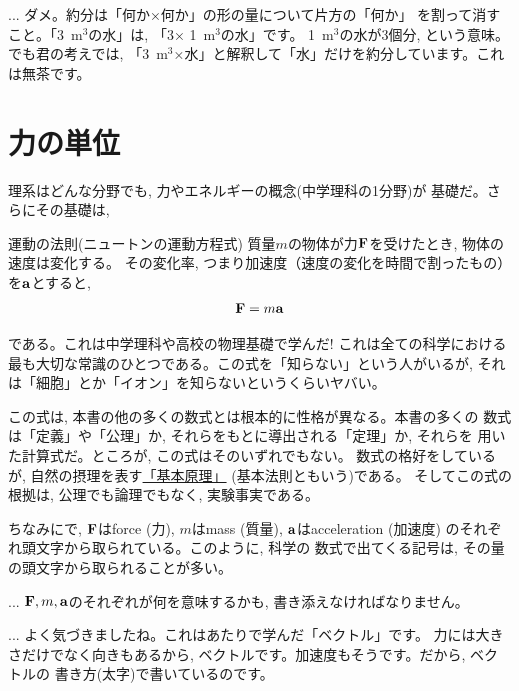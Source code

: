 \begin{faq}{\small{}
 ... ダメ。約分は「何か×何か」の形の量について片方の「何か」
を割って消すこと。「3~m$^3$の水」は, 「3× 1~m$^3$の水」です。
1~m$^3$の水が3個分, という意味。でも君の考えでは, 
「3~m$^3$×水」と解釈して「水」だけを約分しています。これは無茶です。}
\end{faq}
\mv


\section{力の単位}

理系はどんな分野でも, 力やエネルギーの概念(中学理科の1分野)が
基礎だ。さらにその基礎は, 
\begin{itembox}{運動の法則(ニュートンの運動方程式)}
質量$m$の物体が力${\bf F}$を受けたとき, 物体の速度は変化する。
その変化率, つまり加速度（速度の変化を時間で割ったもの）を${\bf a}$とすると,
\begin{eqnarray}{\bf F}=m{\bf a}\label{eq:Newton_eqmotion}\end{eqnarray}
\end{itembox}
である。これは中学理科や高校の物理基礎で学んだ! これは全ての科学における
最も大切な常識のひとつである。この式を「知らない」という人がいるが, 
それは「細胞」とか「イオン」を知らないというくらいヤバい。

この式は, 本書の他の多くの数式とは根本的に性格が異なる。本書の多くの
数式は「定義」や「公理」か, それらをもとに導出される「定理」か, それらを
用いた計算式だ。ところが, この式はそのいずれでもない。
数式の格好をしているが, 自然の摂理を表す\underline{「基本原理」}
(基本法則ともいう)である。
そしてこの式の根拠は, 公理でも論理でもなく, 実験事実である。

ちなみにで, ${\bf F}$はforce (力), 
$m$はmass (質量), ${\bf a}$はacceleration (加速度)
のそれぞれ頭文字から取られている。このように, 科学の
数式で出てくる記号は, その量の頭文字から取られることが多い。

\begin{freqmiss}{\small{}
 ... ${\bf F}, m, {\bf a}$のそれぞれが何を意味するかも, 書き添えなければなりません。}
\end{freqmiss}

\begin{faq}{\small{}
 ... よく気づきましたね。これはあたりで学んだ「ベクトル」です。
力には大きさだけでなく向きもあるから, ベクトルです。加速度もそうです。だから, ベクトルの
書き方(太字)で書いているのです。}\end{faq}
\mv


